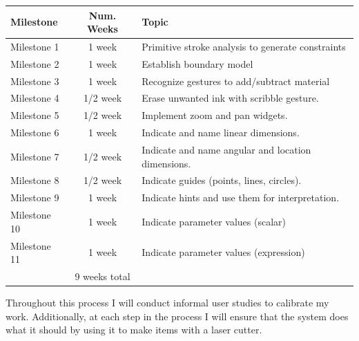 \documentclass[12pt]{article}
\begin{document}
\vspace{12pt}
\begin{tabular}{ | l | c | l | }
  \hline

  \textbf{Milestone} & \textbf{Num. Weeks} & \textbf{Topic} \\

  \hline \hline

  Milestone 1 & 1 week & Primitive stroke analysis to generate constraints \\
  
  Milestone 2 & 1 week & Establish boundary model \\

  Milestone 3 & 1 week & Recognize gestures to add/subtract material \\

  Milestone 4 & 1/2 week & Erase unwanted ink with scribble gesture. \\

  Milestone 5 & 1/2 week & Implement zoom and pan widgets. \\ 

  Milestone 6 & 1 week & Indicate and name linear dimensions. \\

  Milestone 7 & 1/2 week & Indicate and name angular and location dimensions. \\

  Milestone 8 & 1/2 week & Indicate guides (points, lines, circles). \\ 

  Milestone 9 & 1 week & Indicate hints and use them for interpretation. \\ 

  Milestone 10 & 1 week & Indicate parameter values (scalar) \\ 

  Milestone 11 & 1 week & Indicate parameter values (expression) \\

  \hline
  
  & 9 weeks total & \\

  \hline

\end{tabular}
\vspace{12pt}

Throughout this process I will conduct informal user studies to
calibrate my work. Additionally, at each step in the process I will
ensure that the system does what it should by using it to make items
with a laser cutter. 
\end{document}
